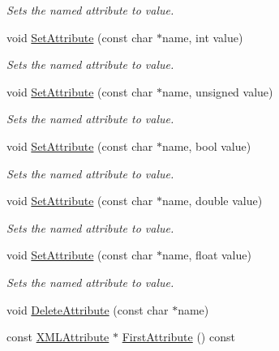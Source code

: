 \begin{DoxyCompactItemize}
\begin{DoxyCompactList}\small\item\em Sets the named attribute to value. \end{DoxyCompactList}\item 
void \hyperlink{classtinyxml2_1_1_x_m_l_element_aae6568c64c7f1cc88be8461ba41a79cf}{Set\+Attribute} (const char $\ast$name, int value)
\begin{DoxyCompactList}\small\item\em Sets the named attribute to value. \end{DoxyCompactList}\item 
void \hyperlink{classtinyxml2_1_1_x_m_l_element_ae143997e90064ba82326b29a9930ea8f}{Set\+Attribute} (const char $\ast$name, unsigned value)
\begin{DoxyCompactList}\small\item\em Sets the named attribute to value. \end{DoxyCompactList}\item 
void \hyperlink{classtinyxml2_1_1_x_m_l_element_aa848b696e6a75e4e545c6da9893b11e1}{Set\+Attribute} (const char $\ast$name, bool value)
\begin{DoxyCompactList}\small\item\em Sets the named attribute to value. \end{DoxyCompactList}\item 
void \hyperlink{classtinyxml2_1_1_x_m_l_element_a233397ee81e70eb5d4b814c5f8698533}{Set\+Attribute} (const char $\ast$name, double value)
\begin{DoxyCompactList}\small\item\em Sets the named attribute to value. \end{DoxyCompactList}\item 
void \hyperlink{classtinyxml2_1_1_x_m_l_element_a554b70d882e65b28fc084b23df9b9759}{Set\+Attribute} (const char $\ast$name, float value)
\begin{DoxyCompactList}\small\item\em Sets the named attribute to value. \end{DoxyCompactList}\item 
void \hyperlink{classtinyxml2_1_1_x_m_l_element_aebd45aa7118964c30b32fe12e944628a}{Delete\+Attribute} (const char $\ast$name)
\item 
const \hyperlink{classtinyxml2_1_1_x_m_l_attribute}{X\+M\+L\+Attribute} $\ast$ \hyperlink{classtinyxml2_1_1_x_m_l_element_a67593e63558ffda0386699c3e4cc0b2c}{First\+Attribute} () const 

\end{DoxyCompactItemize}
